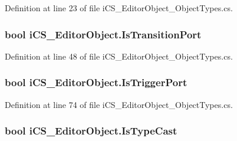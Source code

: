 Definition at line 23 of file i\+C\+S\+\_\+\+Editor\+Object\+\_\+\+Object\+Types.\+cs.

\hypertarget{classi_c_s___editor_object_a7f592e9ce23e2e67ea71e8beb42d2e9e}{
\subsubsection[{Is\+Transition\+Port}]{\setlength{\rightskip}{0pt plus 5cm}bool i\+C\+S\+\_\+\+Editor\+Object.\+Is\+Transition\+Port\hspace{0.3cm}{\ttfamily [get]}}}\label{classi_c_s___editor_object_a7f592e9ce23e2e67ea71e8beb42d2e9e}


Definition at line 48 of file i\+C\+S\+\_\+\+Editor\+Object\+\_\+\+Object\+Types.\+cs.

\hypertarget{classi_c_s___editor_object_a6d236c37b043ecd5d8465c32beaecab2}{
\subsubsection[{Is\+Trigger\+Port}]{\setlength{\rightskip}{0pt plus 5cm}bool i\+C\+S\+\_\+\+Editor\+Object.\+Is\+Trigger\+Port\hspace{0.3cm}{\ttfamily [get]}}}\label{classi_c_s___editor_object_a6d236c37b043ecd5d8465c32beaecab2}


Definition at line 74 of file i\+C\+S\+\_\+\+Editor\+Object\+\_\+\+Object\+Types.\+cs.

\hypertarget{classi_c_s___editor_object_a661f9c9b758ea3d414a8d85eb4e256f6}{
\subsubsection[{Is\+Type\+Cast}]{\setlength{\rightskip}{0pt plus 5cm}bool i\+C\+S\+\_\+\+Editor\+Object.\+Is\+Type\+Cast\hspace{0.3cm}{\ttfamily [get]}}}\label{classi_c_s___editor_object_a661f9c9b758ea3d414a8d85eb4e256f6}


